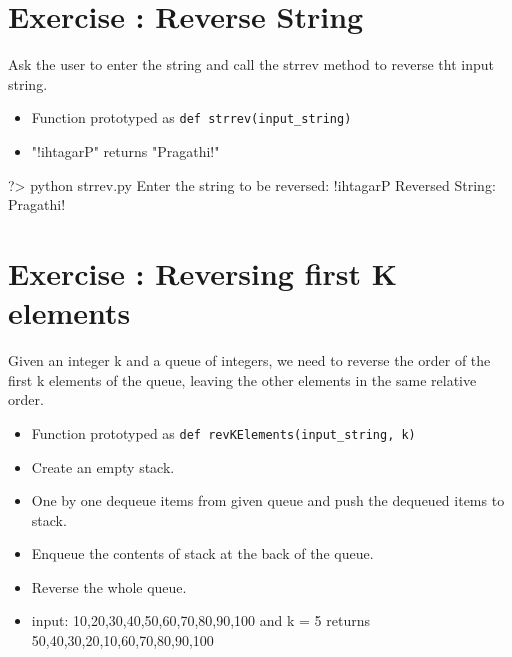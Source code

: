 \documentclass{42-en}
\begin{document}
\nextexercice
\chapter{Exercise \exercicenumber: Reverse String}

\exnumber{\exercicenumber}

\makeheaderfiles

Ask the user to enter the string and call the strrev method to reverse tht input string.

		\begin{itemize}\itemsep1pt
			\item Function prototyped as \texttt{def strrev(input\_string)}
			\item "!ihtagarP" returns "Pragathi!"
        	\end{itemize}


		\begin{42console}
			?> python strrev.py
			Enter the string to be reversed: !ihtagarP
			Reversed String: Pragathi!
		\end{42console}


\chapter{Exercise \exercicenumber: Reversing first K elements}

\exnumber{\exercicenumber}

\makeheaderfiles

Given an integer k and a queue of integers, we need to reverse the order of the first k elements
of the queue, leaving the other elements in the same relative order.\\

		\begin{itemize}\itemsep1pt
			\item Function prototyped as \texttt{def revKElements(input\_string, k)}
			\item Create an empty stack.
			\item One by one dequeue items from given queue and push the dequeued items to stack.
			\item Enqueue the contents of stack at the back of the queue.
			\item Reverse the whole queue.
			\item input: 10,20,30,40,50,60,70,80,90,100 and k = 5 returns 50,40,30,20,10,60,70,80,90,100
        	\end{itemize}
\end{document}

